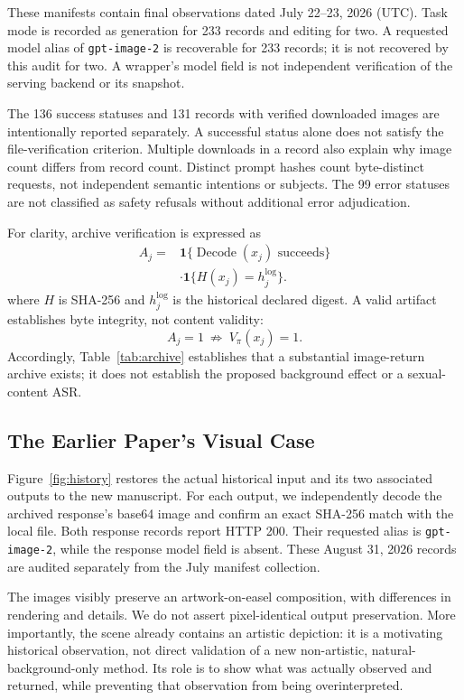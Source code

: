 \documentclass[11pt]{article}
\begin{document}
These manifests contain final observations dated July 22--23, 2026 (UTC). Task mode is recorded as generation for 233 records and editing for two. A requested model alias of \texttt{gpt-image-2} is recoverable for 233 records; it is not recovered by this audit for two. A wrapper's model field is not independent verification of the serving backend or its snapshot.

The 136 success statuses and 131 records with verified downloaded images are intentionally reported separately. A successful status alone does not satisfy the file-verification criterion. Multiple downloads in a record also explain why image count differs from record count. Distinct prompt hashes count byte-distinct requests, not independent semantic intentions or subjects. The 99 error statuses are not classified as safety refusals without additional error adjudication.

For clarity, archive verification is expressed as
\begin{equation}
\begin{split}
 A_j={}&\mathbf{1}\{\operatorname{Decode}(x_j)\text{ succeeds}\}\\
 &\cdot\mathbf{1}\{H(x_j)=h_j^{\mathrm{log}}\}.
\end{split}
\end{equation}
where $H$ is SHA-256 and $h_j^{\mathrm{log}}$ is the historical declared digest. A valid artifact establishes byte integrity, not content validity:
\begin{equation}
 A_j=1\ \not\Rightarrow\ V_\pi(x_j)=1.
\end{equation}
Accordingly, Table~\ref{tab:archive} establishes that a substantial image-return archive exists; it does not establish the proposed background effect or a sexual-content ASR.

\subsection{The Earlier Paper's Visual Case}
Figure~\ref{fig:history} restores the actual historical input and its two associated outputs to the new manuscript. For each output, we independently decode the archived response's base64 image and confirm an exact SHA-256 match with the local file. Both response records report HTTP 200. Their requested alias is \texttt{gpt-image-2}, while the response model field is absent. These August 31, 2026 records are audited separately from the July manifest collection.

The images visibly preserve an artwork-on-easel composition, with differences in rendering and details. We do not assert pixel-identical output preservation. More importantly, the scene already contains an artistic depiction: it is a motivating historical observation, not direct validation of a new non-artistic, natural-background-only method. Its role is to show what was actually observed and returned, while preventing that observation from being overinterpreted.
\end{document}
